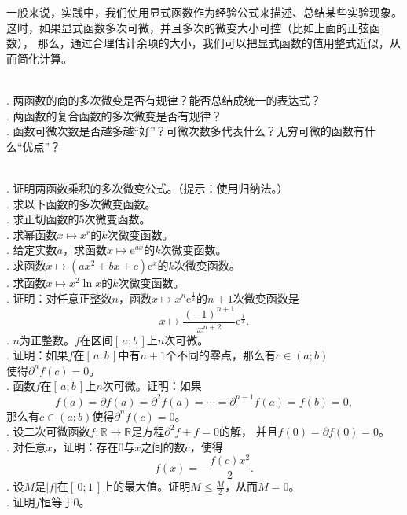 \documentclass[12pt,UTF8]{ctexbook}
\begin{document}
一般来说，实践中，我们使用显式函数作为经验公式来描述、总结某些实验现象。
这时，如果显式函数多次可微，并且多次的微变大小可控（比如上面的正弦函数），
那么，通过合理估计余项的大小，我们可以把显式函数的值用整式近似，从而简化计算。

\begin{sk}
    \mbox{} \\
    . 两函数的商的多次微变是否有规律？能否总结成统一的表达式？\\
    . 两函数的复合函数的多次微变是否有规律？\\
    . 函数可微次数是否越多越“好”？可微次数多代表什么？无穷可微的函数有什么“优点”？
\end{sk}

\begin{xt}
    \mbox{} \\
    . 证明两函数乘积的多次微变公式。（提示：使用归纳法。）\\
    . 求以下函数的多次微变函数。\\
    . 求正切函数的$5$次微变函数。\\
    . 求幂函数$x\mapsto x^r$的$k$次微变函数。\\
    . 给定实数$a$，求函数$x\mapsto \mathrm{e}^{ax}$的$k$次微变函数。\\
    . 求函数$x \mapsto (ax^2 + bx + c)\mathrm{e}^x$的$k$次微变函数。\\
    . 求函数$x \mapsto x^2\ln{x}$的$k$次微变函数。\\
    . 证明：对任意正整数$n$，函数$x\mapsto x^n \mathrm{e}^{\frac{1}{x}}$的$n+1$次微变函数是
    $$x\mapsto \frac{(-1)^{n+1}}{x^{n+2}}\mathrm{e}^{\frac{1}{x}}.$$
    . $n$为正整数。$f$在区间$[\,a; b\,]$上$n$次可微。\\
    . 证明：如果$f$在$[\,a; b\,]$中有$n+1$个不同的零点，那么有$c\in(a; b)$\\
    \indent 使得$\partial^n f(c) = 0$。\\
    . 函数$f$在$[\,a; b\,]$上$n$次可微。证明：如果
    $$f(a) = \partial f(a) = \partial^2 f(a) = \cdots = \partial^{n-1} f(a) = f(b) = 0,$$
    \indent 那么有$c\in(a; b)$使得$\partial^n f(c) = 0$。\\
    . 设二次可微函数$f:\mathbb{R} \rightarrow \mathbb{R}$是方程$\partial^2 f + f = 0$的解，
    并且$f(0) = \partial f(0) = 0$。\\
    . 对任意$x$，证明：存在$0$与$x$之间的数$c$，使得
    $$ f(x) = -\frac{f(c)x^2}{2}. $$
    . 设$M$是$|f|$在$[\,0;1\,]$上的最大值。证明$M \leqslant \frac{M}{2}$，从而$M = 0$。\\
    . 证明$f$恒等于$0$。\\
\end{xt}
\end{document}
